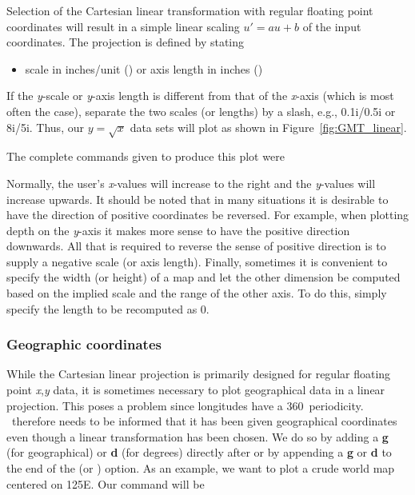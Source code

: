 Selection of the Cartesian linear transformation with regular floating point coordinates
will result in a simple linear scaling $u' = au + b$ of the input coordinates.  The projection
is defined by stating

\begin{itemize}
\item scale in inches/unit () or axis length in inches ()
\end{itemize}

If the {\it y}-scale or {\it y}-axis length is different from that of
the {\it x}-axis (which is most often the case), separate the two
scales (or lengths) by a slash, e.g., 0.1i/0.5i or 8i/5i. 
Thus, our $y = \sqrt{x}$ data sets will plot as shown in Figure~\ref{fig:GMT_linear}.


The complete commands given to produce this plot were 


\noindent
Normally, the user's {\it x}-values will increase to the right
and the {\it y}-values will increase upwards.  It should be noted
that in many situations it is desirable to have the direction of
positive coordinates be reversed.  For example, when plotting
depth on the {\it y}-axis it makes more sense to have the positive
direction downwards.  All that is required to reverse the sense of
positive direction is to supply a negative scale (or axis length).
Finally, sometimes it is convenient to specify the width (or height)
of a map and let the other dimension be computed based on the implied
scale and the range of the other axis.  To do this, simply specify
the length to be recomputed as 0.

\subsubsection{Geographic coordinates}
\label{sec:linear}


While the Cartesian linear projection is primarily designed for regular floating point
{\it x},{\it y} data, it is sometimes necessary to plot geographical
data in a linear projection.  This poses a problem since longitudes
have a 360\DS\ periodicity.  \GMT\ therefore needs to be informed
that it has been given geographical coordinates even though a linear transformation
has been chosen.  We do so by adding a \textbf{g} (for geographical) or \textbf{d} (for degrees)
directly after  or by appending a \textbf{g} or \textbf{d} to
the end of the  (or ) option.  As an example, we
want to plot a crude world map centered on 125\DS E.  Our command will be 

